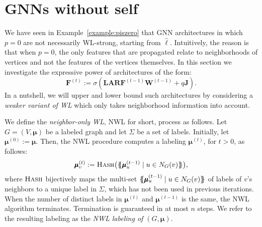 \section{GNNs without self}

We have seen in Example~\ref{example:piszero} that GNN architectures in which $p=0$ are not necessarily WL-strong, starting from $\hat{\pmb{\ell}}$. Intuitively, the reason is that when $p=0$, the only features that are propagated relate to neighborhoods of vertices and not the features of the vertices themselves. In this section we investigate the expressive power of architectures of the form:
\begin{equation}
\mathbf{F}^{(t)}:=\sigma\left(\mathbf{L}\mathbf{A}\mathbf{R}\mathbf{F}^{(t-1)}\mathbf{W}^{(t-1)} + q\mathbf{J}\right). \label{eq:architecture_noid}
\end{equation}
In a nutshell, we will upper and lower bound such architectures by 
 considering a \textit{weaker variant of WL}  which only takes neighborhood information into account.

We define the \textit{neighbor-only WL}, NWL for short, process as follows. Let $G=(V,\pmb{\mu})$ be a labeled graph and let $\Sigma$ be a set of labels. Initially, let $\pmb{\mu}^{(0)}:=\pmb{\mu}$. 
Then, the NWL procedure computes a labeling $\pmb{\mu}^{(t)}$, for $t> 0$, as follows: 
$$
\pmb{\mu}^{(t)}_v:=\textsc{Hash}\bigl(\{\!\!\{ \pmb{\mu}_u^{(t-1)} \mathrel{\mid} u \in N_G(v) \}\!\!\}\bigr),
$$
where $\textsc{Hash}$ bijectively maps the multi-set $\{\!\!\{ \pmb{\mu}_u^{(t-1)} \mathrel{\mid} u \in N_G(v) \}\!\!\}$ of labels of $v$'s neighbors to a unique label in $\Sigma$, which has not been used in previous iterations. When the number of distinct labels in $\pmb{\mu}^{(t)}$ and $\pmb{\mu}^{(t-1)}$ is the same, the NWL algorithm terminates.
Termination is guaranteed in at most $n$ steps. We refer to the resulting labeling as the \textit{NWL labeling of $(G,\pmb{\mu})$}. 

